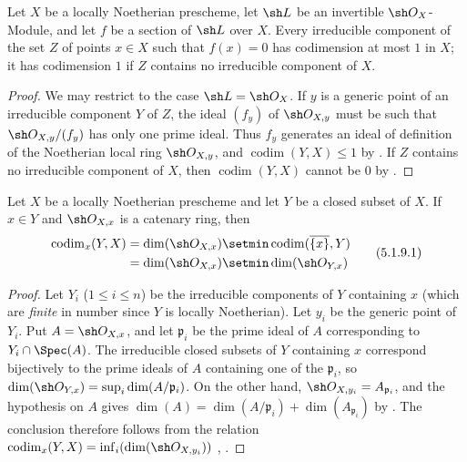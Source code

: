 \begin{corollary}[5.1.8]
\label{IV.5.1.8}
Let $X$ be a locally Noetherian prescheme, let $\sh L$ be an
invertible $\sh O_X$-Module, and let $f$ be a section of $\sh L$ over
$X$.
Every irreducible component of the set $Z$ of points $x\in X$ such
that $f(x)=0$ has codimension at most $1$ in $X$; it has codimension
$1$ if $Z$ contains no irreducible component of $X$.
\end{corollary}

\begin{proof}
We may restrict to the case $\sh L=\sh O_X$.
If $y$ is a generic point of an irreducible component $Y$ of $Z$,
the ideal $(f_y)$ of $\sh O_{X,y}$ must be such that
$\sh O_{X,y}/(f_y)$ has only one prime ideal.
Thus $f_y$ generates an ideal of definition of the Noetherian local
ring $\sh O_{X,y}$, and
$\operatorname{codim}(Y,X)\leq1$ by .
If $Z$ contains no irreducible component of $X$, then
$\operatorname{codim}(Y,X)$ cannot be $0$ by
.
\end{proof}


\begin{proposition}[5.1.9]
\label{IV.5.1.9}
Let $X$ be a locally Noetherian prescheme and let $Y$ be a closed
subset of $X$.
If $x\in Y$ and $\sh O_{X,x}$ is a catenary ring, then
\begin{equation}
\begin{split}
\operatorname{codim}_x(Y,X)
&=\dim(\sh O_{X,x})\setmin\operatorname{codim}(\overline{\{x\}},Y)\\
&=\dim(\sh O_{X,x})\setmin\dim(\sh O_{Y,x})
\end{split}
\tag{5.1.9.1}\label{IV.5.1.9.1}
\end{equation}
\end{proposition}

\begin{proof}
Let $Y_i$ ($1\leq i\leq n$) be the irreducible components of $Y$
containing $x$ (which are \emph{finite} in number since $Y$ is locally
Noetherian).
Let $y_i$ be the generic point of $Y_i$.
Put $A=\sh O_{X,x}$, and let $\mathfrak p_i$ be the prime ideal of
$A$ corresponding to $Y_i\cap\Spec(A)$.
The irreducible closed subsets of $Y$ containing $x$ correspond
bijectively to the prime ideals of $A$ containing one of the
$\mathfrak p_i$, so $\dim(\sh O_{Y,x})=\sup_i\dim(A/\mathfrak p_i)$.
On the other hand, $\sh O_{X,y_i}=A_{\mathfrak p_i}$, and the
hypothesis on $A$ gives $\dim(A)=\dim(A/\mathfrak p_i)+\dim(A_{\mathfrak p_i})$
by .
The conclusion therefore follows from the relation $\operatorname{codim}_x(Y,X)
=\inf_i(\dim(\sh O_{X,y_i}))$
, .
\end{proof}

